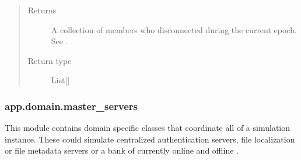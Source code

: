 \documentclass[letterpaper,10pt,english]{sphinxmanual}
\begin{document}
\begin{fulllineitems}
\begin{fulllineitems}
\begin{description}
\end{description}
\begin{quote}\begin{description}
\item[{Returns}] \leavevmode
A collection of members who disconnected during the current
epoch. See
{\hyperref[\detokenize{app.domain:app.domain.network_nodes.Node.update_status}]{}}.

\item[{Return type}] \leavevmode
List{[}{\hyperref[\detokenize{app:app.type_hints.NodeType}]{}}{]}

\end{description}\end{quote}

\end{fulllineitems}


\end{fulllineitems}



\subsubsection{app.domain.master\_servers}
\label{\detokenize{app.domain:module-app.domain.master_servers}}\label{\detokenize{app.domain:app-domain-master-servers}}
This module contains domain specific classes that coordinate all
{\hyperref[\detokenize{app.domain:module-app.domain.cluster_groups}]{}} of a simulation instance. These could
simulate centralized authentication servers, file localization or
file metadata servers or a bank of currently online and offline
{\hyperref[\detokenize{app.domain:module-app.domain.network_nodes}]{}}.
\end{document}
